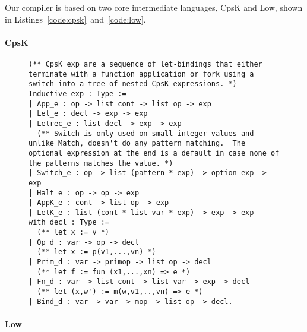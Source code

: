 \documentclass{article}
\begin{document}
Our compiler is based on two core intermediate languages, CpsK and Low, shown in Listings~\ref{code:cpsk}~and~\ref{code:low}.

\paragraph{CpsK}

\begin{figure}
\begin{lstlisting}
(** CpsK exp are a sequence of let-bindings that either terminate with a function application or fork using a switch into a tree of nested CpsK expressions. *)
Inductive exp : Type := 
| App_e : op -> list cont -> list op -> exp
| Let_e : decl -> exp -> exp
| Letrec_e : list decl -> exp -> exp
  (** Switch is only used on small integer values and unlike Match, doesn't do any pattern matching.  The optional expression at the end is a default in case none of the patterns matches the value. *)
| Switch_e : op -> list (pattern * exp) -> option exp -> exp
| Halt_e : op -> op -> exp
| AppK_e : cont -> list op -> exp
| LetK_e : list (cont * list var * exp) -> exp -> exp
with decl : Type := 
  (** let x := v *)
| Op_d : var -> op -> decl
  (** let x := p(v1,...,vn) *)
| Prim_d : var -> primop -> list op -> decl
  (** let f := fun (x1,...,xn) => e *)
| Fn_d : var -> list cont -> list var -> exp -> decl
  (** let (x,w') := m(w,v1,..,vn) => e *)
| Bind_d : var -> var -> mop -> list op -> decl.
\end{lstlisting}
\end{figure}

\paragraph{Low}
\end{document}
